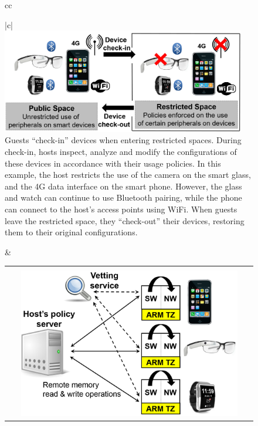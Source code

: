 \begin{figure}[t!]
\centering
\begin{tabular}{cc}
\begin{minipage}{0.46\textwidth}
\centering
\begin{tabular}{|c|}
\hline
\indent\vspace{-0.2cm}\\
\includegraphics[keepaspectratio=true,width=0.95\textwidth]{figures/restricted-space.png}\\
{\small Guests ``check-in'' devices when entering restricted spaces. During
check-in, hosts inspect, analyze and modify the configurations of these devices
in accordance with their usage policies. In this example, the host restricts
the use of the camera on the smart glass, and the 4G data interface on the
smart phone. However, the glass and watch can continue to use Bluetooth
pairing, while the phone can connect to the host's access points using WiFi.
When guests leave the restricted space, they ``check-out'' their devices,
restoring them to their original configurations.}\\
\hline
\end{tabular}
\end{minipage} &  
\begin{minipage}{0.46\textwidth}
\centering
\begin{tabular}{|c|}
\hline
\indent\vspace{-0.4cm}\\
\includegraphics[keepaspectratio=true,width=0.90\textwidth]{figures/host-guest.png}\\

\end{tabular}
\end{minipage}
\end{tabular}
\end{figure}

